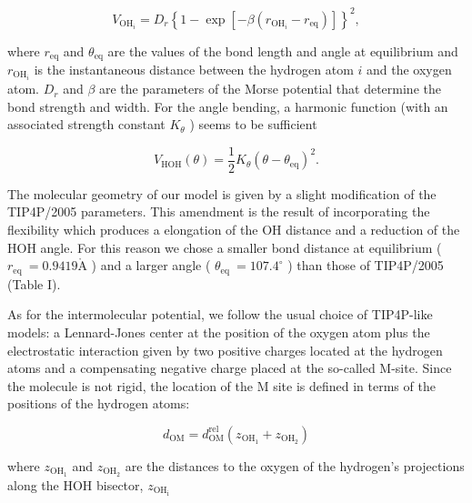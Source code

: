 \documentclass[10pt]{article}
\def\AA{\mathring{\mathrm{A}}}
\begin{document}
\begin{equation*}
V_{\mathrm{OH}_{i}}=D_{r}\left\{1-\exp \left[-\beta\left(r_{\mathrm{OH}_{i}}-r_{\mathrm{eq}}\right)\right]\right\}^{2}, \tag{2}
\end{equation*}


where $r_{\mathrm{eq}}$ and $\theta_{\mathrm{eq}}$ are the values of the bond length and angle at equilibrium and $r_{\mathrm{OH}_{i}}$ is the instantaneous distance between the hydrogen atom $i$ and the oxygen atom. $D_{r}$ and $\beta$ are the parameters of the Morse potential that determine the bond strength and width. For the angle bending, a harmonic function (with an associated strength constant $K_{\theta}$ ) seems to be sufficient


\begin{equation*}
V_{\mathrm{HOH}}(\theta)=\frac{1}{2} K_{\theta}\left(\theta-\theta_{\mathrm{eq}}\right)^{2} . \tag{3}
\end{equation*}


The molecular geometry of our model is given by a slight modification of the TIP4P/2005 parameters. This amendment is the result of incorporating the flexibility which produces a elongation of the OH distance and a reduction of the HOH angle. For this reason we chose a smaller bond distance at equilibrium ( $r_{\text {eq }}=0.9419 \AA$ ) and a larger angle ( $\theta_{\text {eq }}=107.4^{\circ}$ ) than those of TIP4P/2005 (Table I).

As for the intermolecular potential, we follow the usual choice of TIP4P-like models: a Lennard-Jones center at the position of the oxygen atom plus the electrostatic interaction given by two positive charges located at the hydrogen atoms and a compensating negative charge placed at the so-called M-site. Since the molecule is not rigid, the location of the M site is defined in terms of the positions of the hydrogen atoms:


\begin{equation*}
d_{\mathrm{OM}}=d_{\mathrm{OM}}^{\mathrm{rel}}\left(z_{\mathrm{OH}_{1}}+z_{\mathrm{OH}_{2}}\right) \tag{4}
\end{equation*}


where $z_{\mathrm{OH}_{1}}$ and $z_{\mathrm{OH}_{2}}$ are the distances to the oxygen of the hydrogen's projections along the HOH bisector, $z_{\mathrm{OH}_{\mathrm{i}}}$
\end{document}
